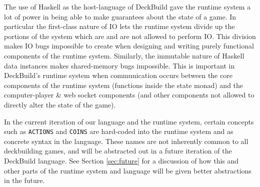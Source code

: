 The use of Haskell as the host-language of DeckBuild gave the runtime system
a lot of power in being able to make guarantees about the state of a game.
In particular the first-class nature of IO lets the runtime system divide
up the portions of the system which are and are not allowed to perform IO.
This division makes IO bugs impossible to create when designing and writing
purely functional components of the runtime system. Similarly, the immutable
nature of Haskell data instances makes shared-memory bugs impossible. This is
important in DeckBuild's runtime system when communication occurs between the
core components of the runtime system (functions inside the state monad)
and the computer-player \& web socket components (and other components not
allowed to directly alter the state of the game).

In the current iteration of our language and the runtime system, certain
concepts such as \texttt{ACTIONS} and \texttt{COINS}
are hard-coded into the runtime system and as concrete syntax in the language.
These names are not inherently common to all deckbuilding games, and will be
abstracted out in a future iteration of the DeckBuild language. See Section
\ref{sec:future} for a discussion of how this and other parts of the runtime
system and language will be given better abstractions in the future.

